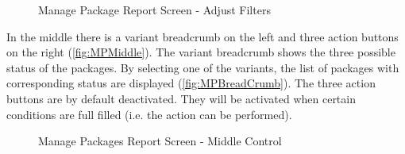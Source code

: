 \begin{figure}[htb]
		\centering
	\vspace{5pt}
 
    \caption{Manage Package Report Screen - Adjust Filters}
    \label{fig:MPAjustFilters}
\end{figure}

In the middle there is a variant breadcrumb on the left and three action buttons on the right (\autoref{fig:MPMiddle}). The variant breadcrumb shows the three possible status of the packages. By selecting one of the variants, the list of packages with corresponding status are displayed (\autoref{fig:MPBreadCrumb}). The three action buttons are by default deactivated. They will be activated when certain conditions are full filled (i.e. the action can be performed).

\begin{figure}[H]
	\centering
	\hspace{5pt}
  \caption{Manage Packages Report Screen - Middle Control}
	\label{fig:MPMiddle}
\end{figure}



